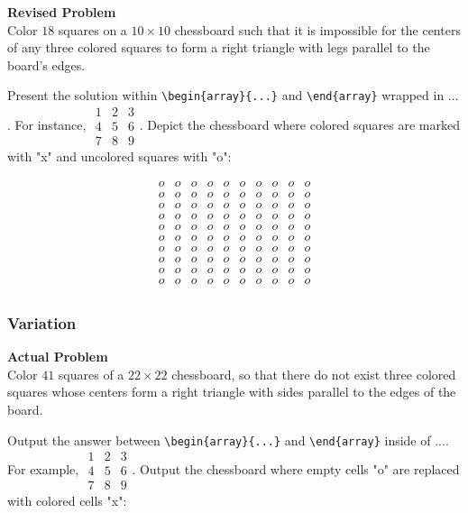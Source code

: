 \textbf{Revised Problem}\\
Color $18$ squares on a $10 \times 10$ chessboard such that it is impossible for the centers of any three colored squares to form a right triangle with legs parallel to the board's edges.

Present the solution within \verb|\begin{array}{...}| and \verb|\end{array}| wrapped in $\boxed{...}$. For instance, $\boxed{\begin{array}{ccc}1 & 2 & 3 \\ 4 & 5 & 6 \\ 7 & 8 & 9\end{array}}$. Depict the chessboard where colored squares are marked with "x" and uncolored squares with "o":

$$\begin{array}{cccccccccc}
o & o & o & o & o & o & o & o & o & o \\
o & o & o & o & o & o & o & o & o & o \\
o & o & o & o & o & o & o & o & o & o \\
o & o & o & o & o & o & o & o & o & o \\
o & o & o & o & o & o & o & o & o & o \\
o & o & o & o & o & o & o & o & o & o \\
o & o & o & o & o & o & o & o & o & o \\
o & o & o & o & o & o & o & o & o & o \\
o & o & o & o & o & o & o & o & o & o \\
o & o & o & o & o & o & o & o & o & o \\
\end{array}$$

\subsubsection{Variation}
\textbf{Actual Problem}\\
Color $41$ squares of a $22 \times 22$ chessboard, so that there do not exist three colored squares whose centers form a right triangle with sides parallel to the edges of the board.

Output the answer between \verb|\begin{array}{...}| and \verb|\end{array}| inside of $\boxed{...}$. For example, $\boxed{\begin{array}{ccc}1 & 2 & 3 \\ 4 & 5 & 6 \\ 7 & 8 & 9\end{array}}$.
Output the chessboard where empty cells "o" are replaced with colored cells "x":

